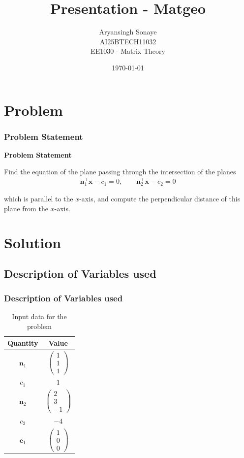 \documentclass{beamer}
\title{Presentation - Matgeo}
\author{Aryansingh Sonaye \\
AI25BTECH11032 \\
EE1030 - Matrix Theory}
\date{\today}
\theoremstyle{remark}
\newcommand{\myvec}[1]{\ensuremath{\begin{pmatrix}#1\end{pmatrix}}}
\let\vec\mathbf
\numberwithin{equation}{section}
\begin{document}
\begin{frame}
\titlepage
\end{frame}

\section{Problem}
\begin{frame}
\frametitle{Problem Statement}
\textbf{Problem Statement}

Find the equation of the plane passing through the intersection of the planes 
\begin{align}
\vec{n}_1^\top \vec{x} - c_1 = 0, 
\qquad
\vec{n}_2^\top \vec{x} - c_2 = 0
\end{align}

which is parallel to the $x$-axis, and compute the perpendicular distance of this plane from the $x$-axis.

\end{frame}

\section{Solution}
\subsection{Description of Variables used}
\begin{frame}
\frametitle{Description of Variables used}
\begin{table}[H]
\centering
\begin{tabular}{|c|c|}
\hline
\textbf{Quantity} & \textbf{Value} \\
\hline
$\vec{n}_1$ & $\myvec{1\\1\\1}$ \\
\hline
$c_1$ & $1$ \\
\hline
$\vec{n}_2$ & $\myvec{2\\3\\-1}$ \\
\hline
$c_2$ & $-4$ \\
\hline
$\vec{e}_1$ & $\myvec{1\\0\\0}$ \\
\hline
\end{tabular}
\caption{Input data for the problem}
\label{}
\end{table}


\end{frame}
\end{document}
